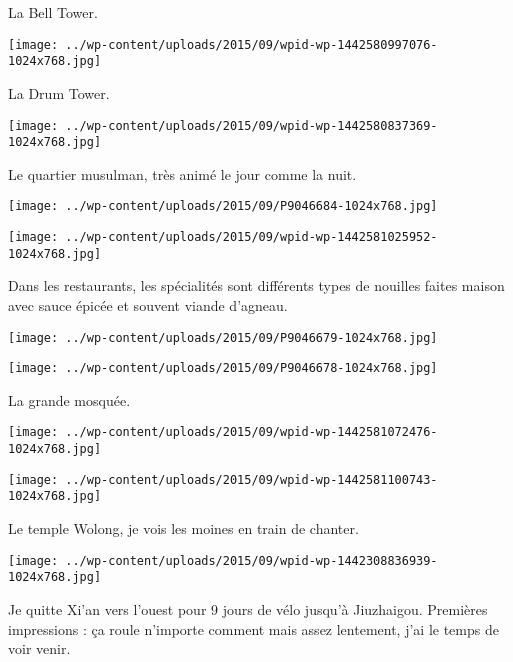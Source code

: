  La Bell Tower.
\begin{center} \texttt{[image: ../wp-content/uploads/2015/09/wpid-wp-1442580997076-1024x768.jpg]} \end{center}

 La Drum Tower. 
\begin{center} \texttt{[image: ../wp-content/uploads/2015/09/wpid-wp-1442580837369-1024x768.jpg]} \end{center}

 Le quartier musulman, très animé le jour comme la nuit.
\begin{center} \texttt{[image: ../wp-content/uploads/2015/09/P9046684-1024x768.jpg]} \end{center}
\begin{center} \texttt{[image: ../wp-content/uploads/2015/09/wpid-wp-1442581025952-1024x768.jpg]} \end{center}

 Dans les restaurants, les spécialités sont différents types de nouilles faites maison avec sauce épicée et souvent viande d'agneau. 
\begin{center} \texttt{[image: ../wp-content/uploads/2015/09/P9046679-1024x768.jpg]} \end{center}
\begin{center} \texttt{[image: ../wp-content/uploads/2015/09/P9046678-1024x768.jpg]} \end{center}

 La grande mosquée.
\begin{center} \texttt{[image: ../wp-content/uploads/2015/09/wpid-wp-1442581072476-1024x768.jpg]} \end{center}
\begin{center} \texttt{[image: ../wp-content/uploads/2015/09/wpid-wp-1442581100743-1024x768.jpg]} \end{center}
 
 Le temple Wolong, je vois les moines en train de chanter. 
\begin{center} \texttt{[image: ../wp-content/uploads/2015/09/wpid-wp-1442308836939-1024x768.jpg]} \end{center}

\pagebreak
 Je quitte Xi'an vers l'ouest pour 9 jours de vélo jusqu'à Jiuzhaigou. Premières impressions : ça roule n'importe comment mais assez lentement, j'ai le temps de voir venir.

